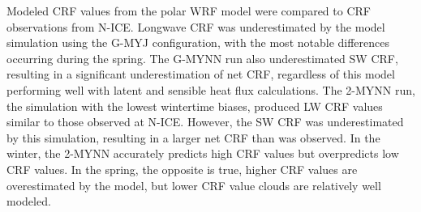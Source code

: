 Modeled CRF values from the polar WRF model were compared to CRF observations from N-ICE. Longwave CRF was underestimated by the model simulation using the G-MYJ configuration, with the most notable differences occurring during the spring. The G-MYNN run also underestimated SW CRF, resulting in a significant underestimation of net CRF, regardless of this model performing well with latent and sensible heat flux calculations. The 2-MYNN run, the simulation with the lowest wintertime biases, produced LW CRF values similar to those observed at N-ICE. However, the SW CRF was underestimated by this simulation, resulting in a larger net CRF than was observed. In the winter, the 2-MYNN accurately predicts high CRF values but overpredicts low CRF values. In the spring, the opposite is true, higher CRF values are overestimated by the model, but lower CRF value clouds are relatively well modeled.


